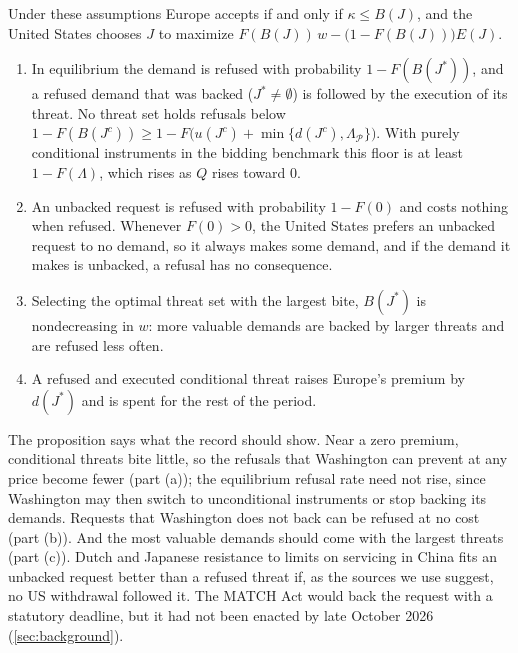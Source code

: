 \begin{proposition}\label{prop:refusal}
Under these assumptions Europe accepts if and only if $\kappa\le B(J)$, and the United States chooses $J$ to maximize $F(B(J))\,w-\big(1-F(B(J))\big)E(J)$.
\begin{enumerate}[label=(\alph*)]
\item In equilibrium the demand is refused with probability $1-F(B(J^*))$, and a refused demand that was backed ($J^*\neq\emptyset$) is followed by the execution of its threat. No threat set holds refusals below $1-F(B(J^c))\ge 1-F\big(u(J^c)+\min\{d(J^c),\Lambda_{\mathcal P}\}\big)$. With purely conditional instruments in the bidding benchmark this floor is at least $1-F(\Lambda)$, which rises as $Q$ rises toward $0$.
\item An unbacked request is refused with probability $1-F(0)$ and costs nothing when refused. Whenever $F(0)>0$, the United States prefers an unbacked request to no demand, so it always makes some demand, and if the demand it makes is unbacked, a refusal has no consequence.
\item Selecting the optimal threat set with the largest bite, $B(J^*)$ is nondecreasing in $w$: more valuable demands are backed by larger threats and are refused less often.
\item A refused and executed conditional threat raises Europe's premium by $d(J^*)$ and is spent for the rest of the period.
\end{enumerate}
\end{proposition}

The proposition says what the record should show. Near a zero premium, conditional threats bite little, so the refusals that Washington can prevent at any price become fewer (part (a)); the equilibrium refusal rate need not rise, since Washington may then switch to unconditional instruments or stop backing its demands. Requests that Washington does not back can be refused at no cost (part (b)). And the most valuable demands should come with the largest threats (part (c)). Dutch and Japanese resistance to limits on servicing in China fits an unbacked request better than a refused threat if, as the sources we use suggest, no US withdrawal followed it. The MATCH Act would back the request with a statutory deadline, but it had not been enacted by late October 2026 (\cref{sec:background}).

